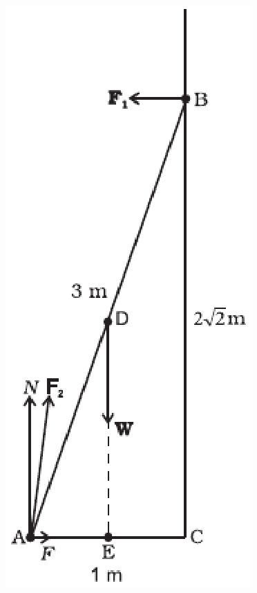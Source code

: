 \begin{enumerate}[label=\arabic*.,ref=\thesubsection.\theenumi]
\begin{figure}[!ht]
\includegraphics[width=\columnwidth]{./figs/11-1/7/7.27.eps}

\end{figure}
\end{enumerate}
